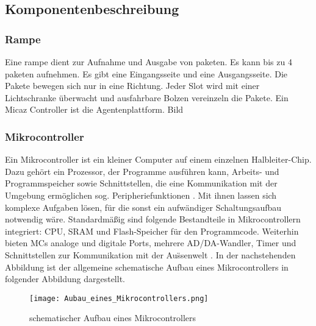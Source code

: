 \subsection{Komponentenbeschreibung}
\subsubsection{Rampe}
Eine rampe dient zur Aufnahme und Ausgabe von paketen. Es kann bis zu 4 paketen aufnehmen. Es gibt eine Eingangsseite und eine
Ausgangsseite. Die Pakete bewegen sich nur in eine Richtung. Jeder Slot wird mit einer Lichtschranke überwacht und ausfahrbare 
Bolzen vereinzeln die Pakete. Ein Micaz Controller ist die Agentenplattform. Bild

\subsubsection{Mikrocontroller}
Ein Mikrocontroller ist ein kleiner Computer auf einem einzelnen Halbleiter-Chip. Dazu geh\"ort ein Prozessor,
der Programme ausf\"uhren kann, Arbeits- und Programmspeicher sowie Schnittstellen, die eine Kommunikation mit 
der Umgebung erm\"oglichen sog. Peripheriefunktionen \cite{Wikibooks:2014:Online}. Mit ihnen lassen sich komplexe
Aufgaben l\"osen, f\"ur die sonst ein aufw\"andiger Schaltungsaufbau notwendig w\"are. Standardm\"a{\ss}ig sind folgende Bestandteile in Mikrocontrollern integriert:
CPU, SRAM und Flash-Speicher f\"ur den Programmcode. Weiterhin bieten MCs analoge und digitale Ports, 
mehrere AD/DA-Wandler, Timer und Schnittstellen zur Kommunikation mit der Au\"{ss}enwelt \cite[vgl.]{Viktor:Seib:2014:Online}.
In der nachstehenden Abbildung ist der allgemeine schematische Aufbau eines Mikrocontrollers in folgender Abbildung dargestellt.
\begin{figure}[h!]
	\centering
		\texttt{[image: Aubau\_eines\_Mikrocontrollers.png]}
	\caption{schematischer Aufbau eines Mikrocontrollers \cite{habil:Ostermeye:2014:Online}}
	\label{Aufbau eines Mikrocontrollers}
\end{figure}

